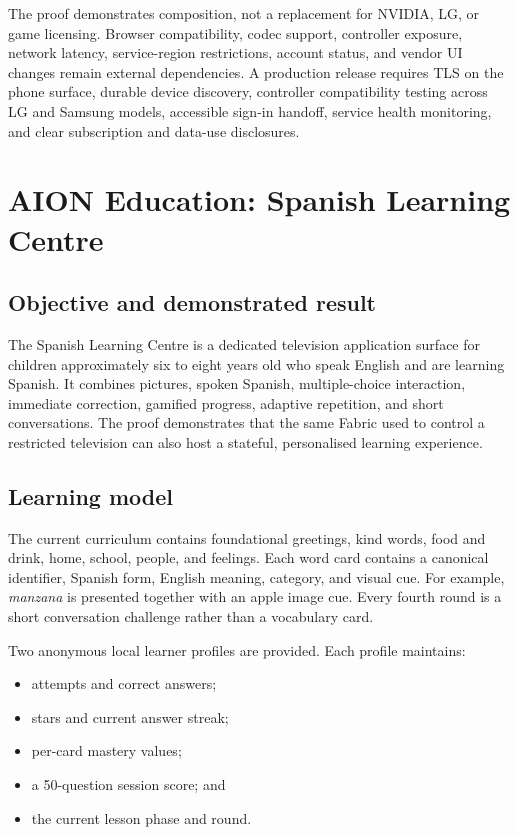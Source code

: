 \documentclass[11pt,a4paper]{article}
\begin{document}
The proof demonstrates composition, not a replacement for NVIDIA, LG, or game
licensing.  Browser compatibility, codec support, controller exposure, network
latency, service-region restrictions, account status, and vendor UI changes
remain external dependencies.  A production release requires TLS on the phone
surface, durable device discovery, controller compatibility testing across LG
and Samsung models, accessible sign-in handoff, service health monitoring, and
clear subscription and data-use disclosures.

\section{AION Education: Spanish Learning Centre}

\subsection{Objective and demonstrated result}

The Spanish Learning Centre is a dedicated television application surface for
children approximately six to eight years old who speak English and are
learning Spanish.  It combines pictures, spoken Spanish, multiple-choice
interaction, immediate correction, gamified progress, adaptive repetition,
and short conversations.  The proof demonstrates that the same Fabric used to
control a restricted television can also host a stateful, personalised
learning experience.

\subsection{Learning model}

The current curriculum contains foundational greetings, kind words, food and
drink, home, school, people, and feelings.  Each word card contains a canonical
identifier, Spanish form, English meaning, category, and visual cue.  For
example, \emph{manzana} is presented together with an apple image cue.  Every
fourth round is a short conversation challenge rather than a vocabulary card.

Two anonymous local learner profiles are provided.  Each profile maintains:

\begin{itemize}[leftmargin=*]
  \item attempts and correct answers;
  \item stars and current answer streak;
  \item per-card mastery values;
  \item a 50-question session score; and
  \item the current lesson phase and round.
\end{itemize}
\end{document}
